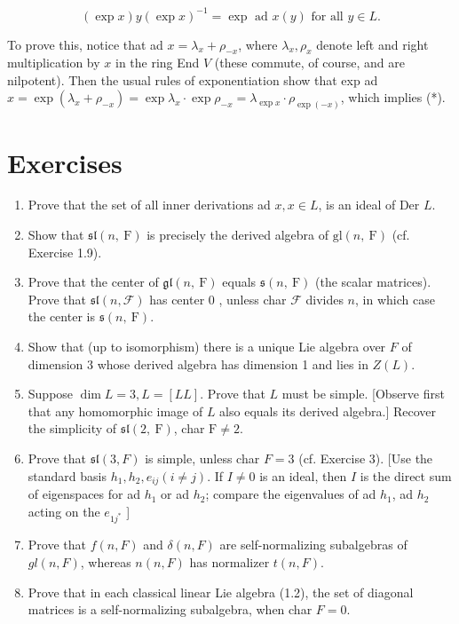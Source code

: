 \documentclass[10pt]{article}
\begin{document}
\begin{equation*}
(\exp x) y(\exp x)^{-1}=\exp \text { ad } x(y) \text { for all } y \in L . \tag{*}
\end{equation*}


To prove this, notice that ad $x=\lambda_{x}+\rho_{-x}$, where $\lambda_{x}, \rho_{x}$ denote left and right multiplication by $x$ in the ring End $V$ (these commute, of course, and are nilpotent). Then the usual rules of exponentiation show that exp ad $x=\exp \left(\lambda_{x}+\rho_{-x}\right)=\exp \lambda_{x} \cdot \exp \rho_{-x}=\lambda_{\exp x} \cdot \rho_{\exp (-x)}$, which implies (*).

\section*{Exercises}
\begin{enumerate}
  \item Prove that the set of all inner derivations ad $x, x \in L$, is an ideal of Der $L$.
  \item Show that $\mathfrak{s l}(n, \mathrm{~F})$ is precisely the derived algebra of $\mathrm{gl}(n, \mathrm{~F})$ (cf. Exercise 1.9).
  \item Prove that the center of $\mathfrak{g l}(n, \mathrm{~F})$ equals $\mathfrak{s}(n, \mathrm{~F})$ (the scalar matrices). Prove that $\mathfrak{s l}(n, \mathcal{F})$ has center 0 , unless char $\mathcal{F}$ divides $n$, in which case the center is $\mathfrak{s}(n, \mathrm{~F})$.
  \item Show that (up to isomorphism) there is a unique Lie algebra over $F$ of dimension 3 whose derived algebra has dimension 1 and lies in $Z(L)$.
  \item Suppose $\operatorname{dim} L=3, L=[L L]$. Prove that $L$ must be simple. [Observe first that any homomorphic image of $L$ also equals its derived algebra.] Recover the simplicity of $\mathfrak{s l}(2, \mathrm{~F})$, char $\mathrm{F} \neq 2$.
  \item Prove that $\mathfrak{s l}(3, F)$ is simple, unless char $F=3$ (cf. Exercise 3). [Use the standard basis $h_{1}, h_{2}, e_{i j}(i \neq j)$. If $I \neq 0$ is an ideal, then $I$ is the direct sum of eigenspaces for ad $h_{1}$ or ad $h_{2}$; compare the eigenvalues of ad $h_{1}$, ad $h_{2}$ acting on the $e_{1 j^{*}}$ ]
  \item Prove that $f(n, F)$ and $\delta(n, F)$ are self-normalizing subalgebras of $g l(n, F)$, whereas $n(n, F)$ has normalizer $t(n, F)$.
  \item Prove that in each classical linear Lie algebra (1.2), the set of diagonal matrices is a self-normalizing subalgebra, when char $F=0$.

\end{enumerate}
\end{document}
